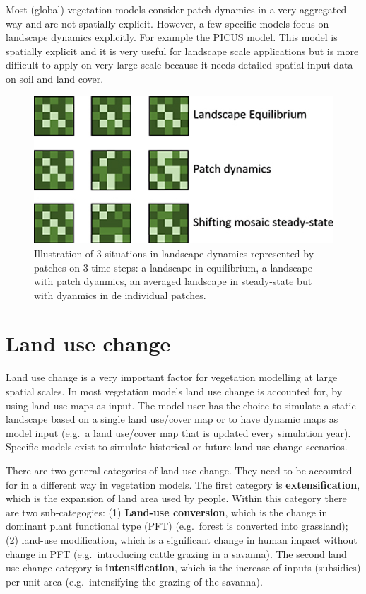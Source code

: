 \documentclass[12pt,oneside]{book}
\begin{document}
Most (global) vegetation models consider patch dynamics in a very
aggregated way and are not spatially explicit. However, a few specific
models focus on landscape dynamics explicitly. For example the PICUS
model. This model is spatially explicit and it is very useful for
landscape scale applications but is more difficult to apply on very
large scale because it needs detailed spatial input data on soil and
land cover.

\begin{figure}

{\centering \includegraphics[width=0.8\linewidth]{figures/chap8/f82_patch} 

}

\caption{Illustration of 3 situations in landscape dynamics represented by patches on 3 time steps: a landscape in equilibrium, a landscape with patch dyanmics, an averaged landscape in steady-state but with dyanmics in de individual patches.}\label{fig:f82}
\end{figure}

\section{Land use change}\label{land-use-change}

Land use change is a very important factor for vegetation modelling at
large spatial scales. In most vegetation models land use change is
accounted for, by using land use maps as input. The model user has the
choice to simulate a static landscape based on a single land use/cover
map or to have dynamic maps as model input (e.g.~a land use/cover map
that is updated every simulation year). Specific models exist to
simulate historical or future land use change scenarios.

There are two general categories of land-use change. They need to be
accounted for in a different way in vegetation models. The first
category is \textbf{extensification}, which is the expansion of land
area used by people. Within this category there are two sub-categogies:
(1) \textbf{Land-use conversion}, which is the change in dominant plant
functional type (PFT) (e.g.~forest is converted into grassland); (2)
land-use modification, which is a significant change in human impact
without change in PFT (e.g.~introducing cattle grazing in a savanna).
The second land use change category is \textbf{intensification}, which
is the increase of inputs (subsidies) per unit area (e.g.~intensifying
the grazing of the savanna).
\end{document}
